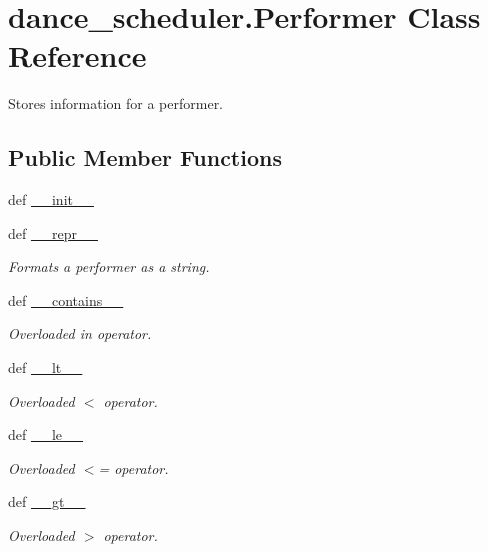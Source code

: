 \hypertarget{classdance__scheduler_1_1Performer}{\section{dance\-\_\-scheduler.\-Performer Class Reference}
\label{classdance__scheduler_1_1Performer}
}


Stores information for a performer.  


\subsection*{Public Member Functions}
\begin{DoxyCompactItemize}
\item 
def \hyperlink{classdance__scheduler_1_1Performer_af4a4414f6e8a8ce5e11e878ae2451796}{\-\_\-\-\_\-init\-\_\-\-\_\-}
\item 
def \hyperlink{classdance__scheduler_1_1Performer_a55659faf363e0050f78fed267749eba7}{\-\_\-\-\_\-repr\-\_\-\-\_\-}
\begin{DoxyCompactList}\small\item\em Formats a performer as a string. \end{DoxyCompactList}\item 
def \hyperlink{classdance__scheduler_1_1Performer_a56e4f6562dab14d6d6ebf09933f1041f}{\-\_\-\-\_\-contains\-\_\-\-\_\-}
\begin{DoxyCompactList}\small\item\em Overloaded in operator. \end{DoxyCompactList}\item 
def \hyperlink{classdance__scheduler_1_1Performer_abae247ab4168420caacce41571b735ef}{\-\_\-\-\_\-lt\-\_\-\-\_\-}
\begin{DoxyCompactList}\small\item\em Overloaded $<$ operator. \end{DoxyCompactList}\item 
def \hyperlink{classdance__scheduler_1_1Performer_a20148d14e579113a5e81aaaf39b46890}{\-\_\-\-\_\-le\-\_\-\-\_\-}
\begin{DoxyCompactList}\small\item\em Overloaded $<$= operator. \end{DoxyCompactList}\item 
def \hyperlink{classdance__scheduler_1_1Performer_a6d77a11e11187b516314251eaa7f1e3c}{\-\_\-\-\_\-gt\-\_\-\-\_\-}
\begin{DoxyCompactList}\small\item\em Overloaded $>$ operator. \end{DoxyCompactList}\item 

\end{DoxyCompactItemize}

